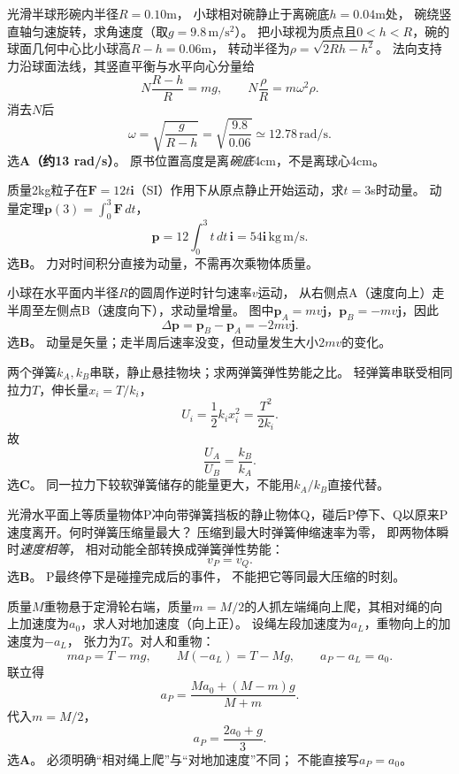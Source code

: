 \problemtext 光滑半球形碗内半径$R=0.10$m，
小球相对碗静止于离碗底$h=0.04$m处，
碗绕竖直轴匀速旋转，求角速度（取$g=9.8\,\mathrm{m/s^2}$）。
\workings
把小球视为质点且$0<h<R$，碗的球面几何中心比小球高$R-h=0.06$m，
转动半径为$\rho=\sqrt{2Rh-h^2}$。
法向支持力沿球面法线，其竖直平衡与水平向心分量给
\[
N\frac{R-h}{R}=mg,\qquad
N\frac{\rho}{R}=m\omega^2\rho.
\]
消去$N$后
\[
\boxed{\omega=\sqrt{\frac g{R-h}}
=\sqrt{\frac{9.8}{0.06}}
\simeq12.78\,\mathrm{rad/s}}.
\]
选\textbf{A（约13 rad/s）}。
\crosscheck 原书位置高度是离\emph{碗底}4cm，不是离球心4cm。

\problemtext 质量2kg粒子在$\bm F=12t\bm i$（SI）作用下从原点静止开始运动，求$t=3$s时动量。
\workings
动量定理$\bm p(3)=\int_0^3\bm F\,dt$，
\[
\boxed{\bm p=12\int_0^3t\,dt\,\bm i
=54\bm i\,\mathrm{kg\,m/s}}.
\]
选\textbf{B}。
\crosscheck 力对时间积分直接为动量，不需再次乘物体质量。

\problemtext 小球在水平面内半径$R$的圆周作逆时针匀速率$v$运动，
从右侧点A（速度向上）走半周至左侧点B（速度向下），求动量增量。
\workings
图中$\bm p_A=mv\bm j$，$\bm p_B=-mv\bm j$，因此
\[
\boxed{\Delta\bm p=\bm p_B-\bm p_A=-2mv\bm j}.
\]
选\textbf{B}。
\crosscheck 动量是矢量；走半周后速率没变，但动量发生大小$2mv$的变化。

\problemtext 两个弹簧$k_A,k_B$串联，静止悬挂物块；求两弹簧弹性势能之比。
\workings
轻弹簧串联受相同拉力$T$，伸长量$x_i=T/k_i$，
\[
U_i=\frac12 k_ix_i^2=\frac{T^2}{2k_i}.
\]
故
\[
\boxed{\frac{U_A}{U_B}=\frac{k_B}{k_A}}.
\]
选\textbf{C}。
\crosscheck 同一拉力下较软弹簧储存的能量更大，不能用$k_A/k_B$直接代替。

\problemtext 光滑水平面上等质量物体P冲向带弹簧挡板的静止物体Q，碰后P停下、Q以原来P速度离开。何时弹簧压缩量最大？
\workings
压缩到最大时弹簧伸缩速率为零，
即两物体瞬时\emph{速度相等}，
相对动能全部转换成弹簧弹性势能：
\[
\boxed{v_P=v_Q}.
\]
选\textbf{B}。
\crosscheck P最终停下是碰撞完成后的事件，
不能把它等同最大压缩的时刻。

\problemtext 质量$M$重物悬于定滑轮右端，质量$m=M/2$的人抓左端绳向上爬，其相对绳的向上加速度为$a_0$，求人对地加速度（向上正）。
\workings
设绳左段加速度为$a_L$，重物向上的加速度为$-a_L$，
张力为$T$。对人和重物：
\[
ma_P=T-mg,\qquad
M(-a_L)=T-Mg,\qquad a_P-a_L=a_0.
\]
联立得
\[
a_P=\frac{M a_0+(M-m)g}{M+m}.
\]
代入$m=M/2$，
\[
\boxed{a_P=\frac{2a_0+g}{3}}.
\]
选\textbf{A}。
\crosscheck 必须明确“相对绳上爬”与“对地加速度”不同；
不能直接写$a_P=a_0$。

